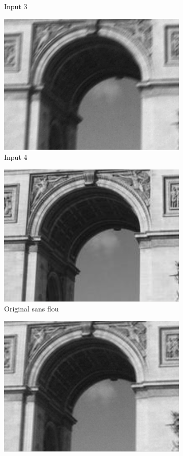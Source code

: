 \documentclass[a4paper,10pt]{report}
\begin{document}
\begin{figure}[h]
\begin{subfigure}{0.24\textwidth}
\caption{Input 3}
\label{fig:Flou3}
\end{subfigure}
\begin{subfigure}{0.24\textwidth}
\includegraphics[width=0.9\linewidth]{ressource/detail_flou4.png}
\caption{Input 4}
\label{fig:Flou4}
\end{subfigure}
\begin{subfigure}{0.32\textwidth}
\includegraphics[width=0.9\linewidth]{ressource/detail_orig.png}
\caption{Original sans flou}
\label{fig:Original}
\end{subfigure}
\begin{subfigure}{0.32\textwidth}
\includegraphics[width=0.9\linewidth]{ressource/detail_result.png}

\end{subfigure}
\end{figure}
\end{document}
